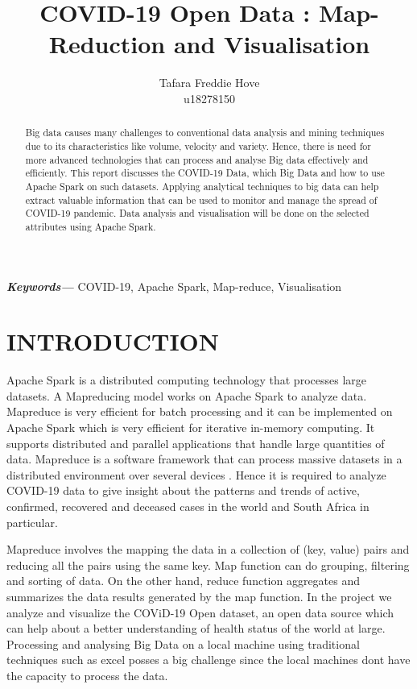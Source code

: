 \documentclass[12pt]{article}
\title{COVID-19 Open Data : Map-Reduction and Visualisation}
\author{Tafara Freddie Hove \\
        \small u18278150 \\
}
\date{}
\providecommand{\keywords}[1]
{
  \small	
  \textbf{\textit{Keywords---}} #1 
}
\begin{document}
\maketitle
\begin{abstract}


Big data  causes many challenges to conventional data analysis and mining  techniques due to its characteristics like volume, velocity and variety. Hence, there is need for more advanced technologies that can process and analyse Big data  effectively and efficiently. This report discusses the COVID-19 Data, which Big Data and how  to use Apache Spark on such datasets. Applying analytical techniques to big data can help extract valuable information that can be used to monitor and manage the spread of COVID-19  pandemic. Data analysis and visualisation will be done on the selected attributes using Apache Spark.

\end{abstract}\hspace{10pt}
\keywords{COVID-19, Apache Spark, Map-reduce, Visualisation}

\section{INTRODUCTION}

Apache Spark is a distributed computing  technology that processes large datasets. A Mapreducing model works on Apache Spark to analyze data. Mapreduce is very efficient for batch processing and it can be implemented on Apache Spark which is very efficient for iterative in-memory computing. It supports distributed and parallel applications that handle large quantities of data. Mapreduce is a software framework  that can process massive datasets in a distributed environment over several devices \cite{}. Hence it is  required to analyze COVID-19 data to give insight about the patterns and trends of active, confirmed, recovered and deceased cases in the world and South Africa in particular.

 Mapreduce involves the mapping the data in a collection of (key, value) pairs and reducing all the pairs using the same key. Map function can do grouping, filtering and sorting of data. On the other hand, reduce function aggregates and summarizes the data results generated by the map function. In the project we analyze and visualize the COViD-19 Open dataset, an open data source  which can help about a better understanding of health status of the world at large. Processing and analysing Big Data on a local machine using traditional techniques such as excel posses a big challenge since the local machines dont have the capacity to process the data.
 
\end{document}

